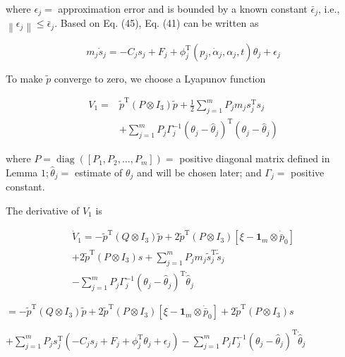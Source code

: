 \documentclass[10pt]{article}
\begin{document}
where $\epsilon_{j}=$ approximation error and is bounded by a known constant $\bar{\epsilon}_{j}$, i.e., $\left\|\epsilon_{j}\right\| \leq \bar{\epsilon}_{j}$. Based on Eq. (45), Eq. (41) can be written as

$$
m_{j} \dot{s}_{j}=-C_{j} s_{j}+F_{j}+\phi_{j}^{\mathrm{T}}\left(p_{j}, \dot{\alpha}_{j}, \alpha_{j}, t\right) \theta_{j}+\epsilon_{j}
$$

To make $\tilde{p}$ converge to zero, we choose a Lyapunov function

$$
\begin{aligned}
V_{1}= & \tilde{p}^{\mathrm{T}}\left(P \otimes I_{3}\right) \tilde{p}+\frac{1}{2} \sum_{j=1}^{m} P_{j} m_{j} s_{j}^{\mathrm{T}} s_{j} \\
& +\sum_{j=1}^{m} P_{j} \Gamma_{j}^{-1}\left(\theta_{j}-\hat{\theta}_{j}\right)^{\mathrm{T}}\left(\theta_{j}-\hat{\theta}_{j}\right)
\end{aligned}
$$

where $P=\operatorname{diag}\left(\left[P_{1}, P_{2}, \ldots, P_{m}\right]\right)=$ positive diagonal matrix defined in Lemma $1 ; \hat{\theta}_{j}=$ estimate of $\theta_{j}$ and will be chosen later; and $\Gamma_{j}=$ positive constant.

The derivative of $V_{1}$ is

$$
\begin{gathered}
\dot{V}_{1}=-\tilde{p}^{\mathrm{T}}\left(Q \otimes I_{3}\right) \tilde{p}+2 \tilde{p}^{\mathrm{T}}\left(P \otimes I_{3}\right)\left[\xi-\mathbf{1}_{m} \otimes \dot{\bar{p}}_{0}\right] \\
+2 \tilde{p}^{\mathrm{T}}\left(P \otimes I_{3}\right) s+\sum_{j=1}^{m} P_{j} m_{j} \tilde{s}_{j}^{\mathrm{T}} \dot{\tilde{s}}_{j} \\
-\sum_{j=1}^{m} P_{j} \Gamma_{j}^{-1}\left(\theta_{j}-\hat{\theta}_{j}\right)^{\mathrm{T}} \dot{\hat{\theta}}_{j}
\end{gathered}
$$

$=-\tilde{p}^{\mathrm{T}}\left(Q \otimes I_{3}\right) \tilde{p}+2 \tilde{p}^{\mathrm{T}}\left(P \otimes I_{3}\right)\left[\xi-\mathbf{1}_{m} \otimes \dot{\bar{p}}_{0}\right]+2 \tilde{p}^{\mathrm{T}}\left(P \otimes I_{3}\right) s$

$+\sum_{j=1}^{m} P_{j} s_{j}^{\mathrm{T}}\left(-C_{j} s_{j}+F_{j}+\phi_{j}^{\mathrm{T}} \theta_{j}+\epsilon_{j}\right)-\sum_{j=1}^{m} P_{j} \Gamma_{j}^{-1}\left(\theta_{j}-\hat{\theta}_{j}\right)^{\mathrm{T}} \dot{\hat{\theta}}_{j}$
\end{document}
